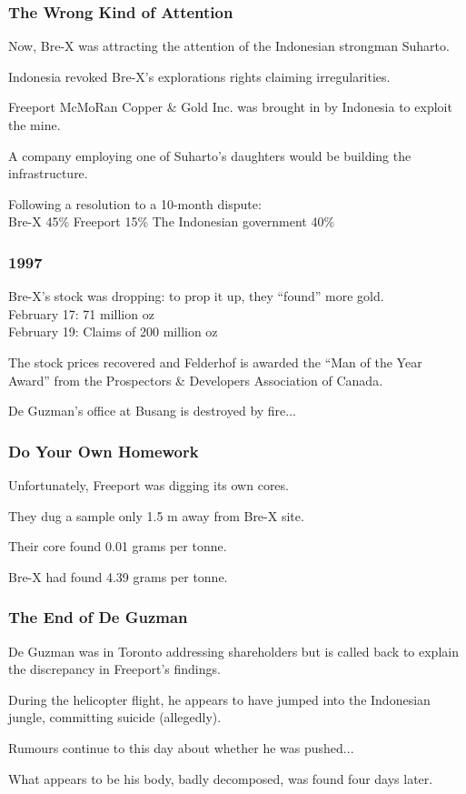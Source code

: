 \begin{frame}
\frametitle{The Wrong Kind of Attention}

Now, Bre-X was attracting the attention of the Indonesian strongman Suharto.

Indonesia revoked Bre-X's explorations rights claiming irregularities.

Freeport McMoRan Copper \& Gold Inc. was brought in by Indonesia to exploit the mine.

A company employing one of Suharto's daughters would be building the infrastructure.

Following a resolution to a 10-month dispute:\\
\quad Bre-X						45\%
\quad Freeport					15\%
\quad The Indonesian government	40\%

\end{frame}



\begin{frame}
\frametitle{1997}

Bre-X's stock was dropping:  to prop it up, they ``found'' more gold.\\
\quad February 17:			71 million oz\\
\quad February 19:			Claims of 200 million oz

The stock prices recovered and Felderhof is awarded the ``Man of the Year Award'' from the Prospectors \& Developers Association of Canada.

De Guzman's office at Busang is destroyed by fire...

\end{frame}



\begin{frame}
\frametitle{Do Your Own Homework}

Unfortunately, Freeport was digging its own cores.

They dug a sample only 1.5 m away from Bre-X site.

Their core found 0.01 grams per tonne.

Bre-X had found 4.39 grams per tonne.

\end{frame}



\begin{frame}
\frametitle{The End of De Guzman}

De Guzman was in Toronto addressing shareholders but is called back to explain the discrepancy in Freeport's findings.

During the helicopter flight, he appears to have jumped into the Indonesian jungle, committing suicide (allegedly).

Rumours continue to this day about whether he was pushed...

What appears to be his body, badly decomposed, was found four days later.

\end{frame}



